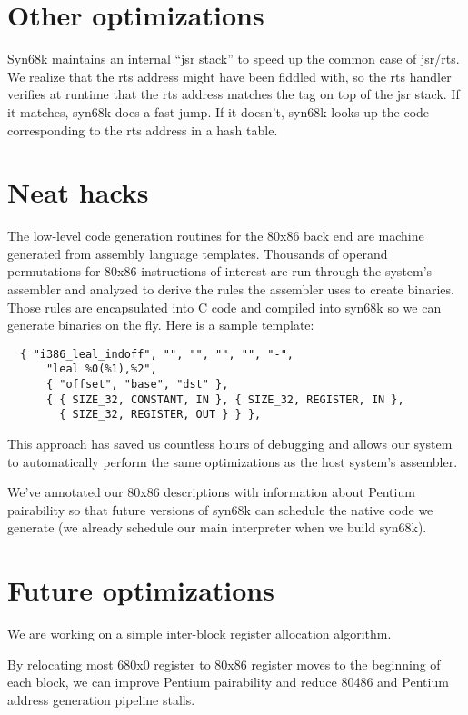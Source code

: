 \section{Other optimizations}

Syn68k maintains an internal ``jsr stack'' to speed up the common
case of jsr/rts.  We realize that the rts address might have been
fiddled with, so the rts handler verifies at runtime that the rts
address matches the tag on top of the jsr stack.  If it matches,
syn68k does a fast jump.  If it doesn't, syn68k looks up the code
corresponding to the rts address in a hash table.

\section{Neat hacks}

The low-level code generation routines for the 80x86 back end are
machine generated from assembly language templates.  Thousands of
operand permutations for 80x86 instructions of interest are run
through the system's assembler and analyzed to derive the rules
the assembler uses to create binaries.  Those rules are encapsulated
into C code and compiled into syn68k so we can generate binaries
on the fly.  Here is a sample template:

\begin{verbatim}
  { "i386_leal_indoff", "", "", "", "", "-",
      "leal %0(%1),%2",
      { "offset", "base", "dst" },
      { { SIZE_32, CONSTANT, IN }, { SIZE_32, REGISTER, IN },
	    { SIZE_32, REGISTER, OUT } } },
\end{verbatim}

This approach has saved us countless hours of debugging and allows
our system to automatically perform the same optimizations as the
host system's assembler.

We've annotated our 80x86 descriptions with information about
Pentium pairability so that future versions of syn68k can schedule
the native code we generate (we already schedule our main interpreter
when we build syn68k).

\section{Future optimizations}

We are working on a simple inter-block register allocation algorithm.

By relocating most 680x0 register to 80x86 register moves to the
beginning of each block, we can improve Pentium pairability and
reduce 80486 and Pentium address generation pipeline stalls.

